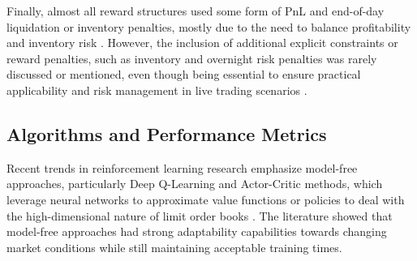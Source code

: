 Finally, almost all reward structures used some form of PnL and end-of-day liquidation or inventory penalties,
mostly due to the need to balance profitability and inventory risk \cite{sun2020marketmaking, gasperov2021marketmaking}.
However, the inclusion of additional explicit constraints or reward penalties, such as inventory and overnight risk penalties was rarely discussed or mentioned,
even though being essential to ensure practical applicability and risk management in live trading scenarios \cite{jerome2022modelbased, selser2021optimal}.

\subsection{Algorithms and Performance Metrics}
Recent trends in reinforcement learning research emphasize model-free approaches, particularly Deep Q-Learning and Actor-Critic methods,
which leverage neural networks to approximate value functions or policies to deal with the high-dimensional nature of limit order books \cite{patel2018optimizing, ganesh2019reinforcement}.
The literature showed that model-free approaches had strong adaptability capabilities towards changing market conditions while still maintaining acceptable training times.

